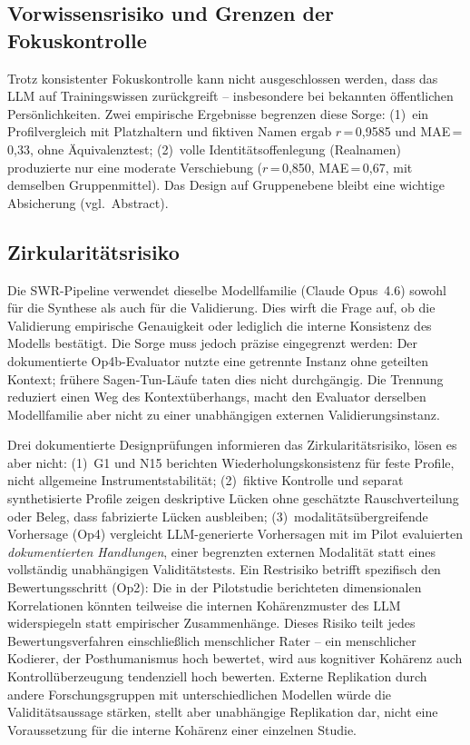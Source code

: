 \documentclass[11pt,a4paper]{article}
\begin{document}
\subsection{Vorwissensrisiko und Grenzen der Fokuskontrolle}
\label{sec:limitations:contamination}

Trotz konsistenter Fokuskontrolle kann nicht ausgeschlossen werden, dass das LLM auf Trainingswissen zurückgreift -- insbesondere bei bekannten öffentlichen Persönlichkeiten. Zwei empirische Ergebnisse begrenzen diese Sorge: (1)~ein Profilvergleich mit Platzhaltern und fiktiven Namen ergab $r$\,=\,0,9585 und MAE\,=\,0,33, ohne Äquivalenztest; (2)~volle Identitätsoffenlegung (Realnamen) produzierte nur eine moderate Verschiebung ($r$\,=\,0,850, MAE\,=\,0,67, mit demselben Gruppenmittel). Das Design auf Gruppenebene bleibt eine wichtige Absicherung (vgl.\ Abstract).


\subsection{Zirkularitätsrisiko}
\label{sec:limitations:circularity}

Die SWR-Pipeline verwendet dieselbe Modellfamilie (Claude Opus~4.6) sowohl für die Synthese als auch für die Validierung. Dies wirft die Frage auf, ob die Validierung empirische Genauigkeit oder lediglich die interne Konsistenz des Modells bestätigt. Die Sorge muss jedoch präzise eingegrenzt werden: Der dokumentierte Op4b-Evaluator nutzte eine getrennte Instanz ohne geteilten Kontext; frühere Sagen-Tun-Läufe taten dies nicht durchgängig. Die Trennung reduziert einen Weg des Kontextüberhangs, macht den Evaluator derselben Modellfamilie aber nicht zu einer unabhängigen externen Validierungsinstanz.

Drei dokumentierte Designprüfungen informieren das Zirkularitätsrisiko, lösen es aber nicht: (1)~G1 und N15 berichten Wiederholungskonsistenz für feste Profile, nicht allgemeine Instrumentstabilität; (2)~fiktive Kontrolle und separat synthetisierte Profile zeigen deskriptive Lücken ohne geschätzte Rauschverteilung oder Beleg, dass fabrizierte Lücken ausbleiben; (3)~modalitätsübergreifende Vorhersage (Op4) vergleicht LLM-generierte Vorhersagen mit im Pilot evaluierten \emph{dokumentierten Handlungen}, einer begrenzten externen Modalität statt eines vollständig unabhängigen Validitätstests. Ein Restrisiko betrifft spezifisch den Bewertungsschritt (Op2): Die in der Pilotstudie berichteten dimensionalen Korrelationen könnten teilweise die internen Kohärenzmuster des LLM widerspiegeln statt empirischer Zusammenhänge. Dieses Risiko teilt jedes Bewertungsverfahren einschließlich menschlicher Rater -- ein menschlicher Kodierer, der Posthumanismus hoch bewertet, wird aus kognitiver Kohärenz auch Kontrollüberzeugung tendenziell hoch bewerten. Externe Replikation durch andere Forschungsgruppen mit unterschiedlichen Modellen würde die Validitätsaussage stärken, stellt aber unabhängige Replikation dar, nicht eine Voraussetzung für die interne Kohärenz einer einzelnen Studie.
\end{document}

